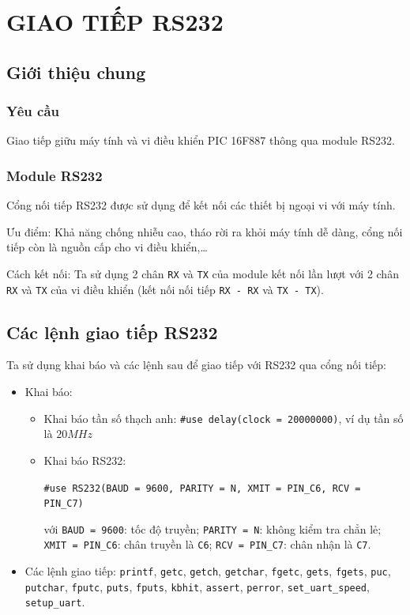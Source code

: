 \chapter{GIAO TIẾP RS232}
\label{chapter:rs232}
\section{Giới thiệu chung}
\subsection{Yêu cầu}
Giao tiếp giữu máy tính và vi điều khiển PIC 16F887 thông qua module RS232.
\subsection{Module RS232}
Cổng nối tiếp RS232 được sử dụng để kết nối các thiết bị ngoại vi với máy tính.

Ưu điểm: Khả năng chống nhiễu cao, tháo rời ra khỏi máy tính dễ dàng, cổng nối tiếp còn là nguồn cấp cho vi điều khiển,\ldots

Cách kết nối: Ta sử dụng 2 chân \verb|RX| và \verb|TX| của module kết nối lần lượt với 2 chân \verb|RX| và \verb|TX| của vi điều khiển (kết nối nối tiếp \verb|RX - RX| và \verb|TX - TX|).
\section{Các lệnh giao tiếp RS232}
Ta sử dụng khai báo và các lệnh sau để giao tiếp với RS232 qua cổng nối tiếp:
\begin{itemize}
\item Khai báo:
\begin{itemize}
\item Khai báo tần số thạch anh: \verb|#use delay(clock = 20000000)|, ví dụ tần số là $20MHz$
\item Khai báo RS232: 

\verb|#use RS232(BAUD = 9600, PARITY = N, XMIT = PIN_C6, RCV = PIN_C7)|

với \verb|BAUD = 9600|: tốc độ truyền; \verb|PARITY = N|: không kiểm tra chẳn lẻ; \verb|XMIT = PIN_C6|: chân truyền là \verb|C6|; \verb|RCV = PIN_C7|: chân nhận là \verb|C7|.
\end{itemize}
\item Các lệnh giao tiếp: \verb|printf|, \verb|getc|, \verb|getch|, \verb|getchar|, \verb|fgetc|, \verb|gets|, \verb|fgets|, \verb|puc|, \verb|putchar|, \verb|fputc|, \verb|puts|, \verb|fputs|, \verb|kbhit|, \verb|assert|, \verb|perror|, \verb|set_uart_speed|, \verb|setup_uart|.
\end{itemize}
